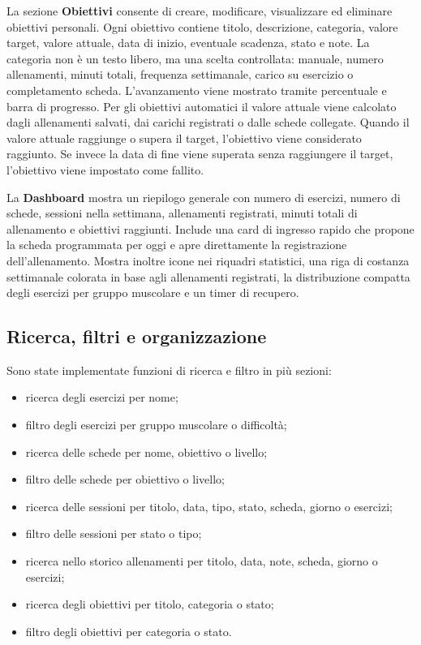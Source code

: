 \documentclass[11pt,a4paper]{article}
\begin{document}
La sezione \textbf{Obiettivi} consente di creare, modificare, visualizzare ed eliminare obiettivi personali. Ogni obiettivo contiene titolo, descrizione, categoria, valore target, valore attuale, data di inizio, eventuale scadenza, stato e note. La categoria non è un testo libero, ma una scelta controllata: manuale, numero allenamenti, minuti totali, frequenza settimanale, carico su esercizio o completamento scheda. L'avanzamento viene mostrato tramite percentuale e barra di progresso. Per gli obiettivi automatici il valore attuale viene calcolato dagli allenamenti salvati, dai carichi registrati o dalle schede collegate. Quando il valore attuale raggiunge o supera il target, l'obiettivo viene considerato raggiunto. Se invece la data di fine viene superata senza raggiungere il target, l'obiettivo viene impostato come fallito.

La \textbf{Dashboard} mostra un riepilogo generale con numero di esercizi, numero di schede, sessioni nella settimana, allenamenti registrati, minuti totali di allenamento e obiettivi raggiunti. Include una card di ingresso rapido che propone la scheda programmata per oggi e apre direttamente la registrazione dell'allenamento. Mostra inoltre icone nei riquadri statistici, una riga di costanza settimanale colorata in base agli allenamenti registrati, la distribuzione compatta degli esercizi per gruppo muscolare e un timer di recupero.

\subsection{Ricerca, filtri e organizzazione}

Sono state implementate funzioni di ricerca e filtro in più sezioni:

\begin{itemize}
  \item ricerca degli esercizi per nome;
  \item filtro degli esercizi per gruppo muscolare o difficoltà;
  \item ricerca delle schede per nome, obiettivo o livello;
  \item filtro delle schede per obiettivo o livello;
  \item ricerca delle sessioni per titolo, data, tipo, stato, scheda, giorno o esercizi;
  \item filtro delle sessioni per stato o tipo;
  \item ricerca nello storico allenamenti per titolo, data, note, scheda, giorno o esercizi;
  \item ricerca degli obiettivi per titolo, categoria o stato;
  \item filtro degli obiettivi per categoria o stato.
\end{itemize}
\end{document}
